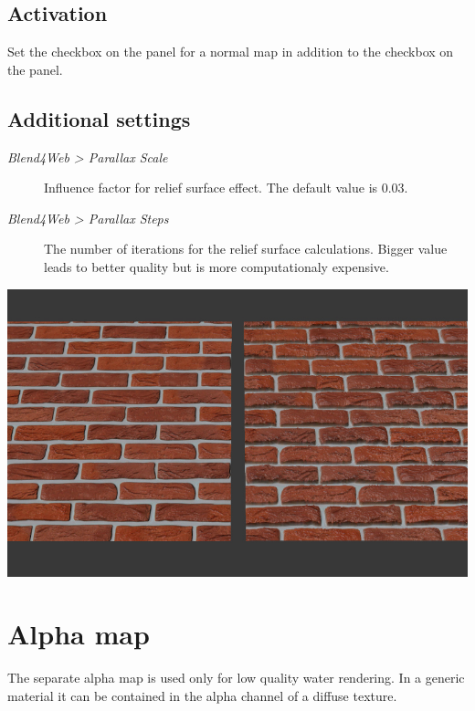 \documentclass[a4paper,12pt,oneside]{sphinxmanual}
\begin{document}
\subsection{Activation}
\label{textures:id10}
Set the  checkbox on the  panel for a normal map in addition to the  checkbox on the  panel.


\subsection{Additional settings}
\label{textures:id11}\begin{description}
\item[{\emph{Blend4Web \textgreater{} Parallax Scale}}] \leavevmode
Influence factor for relief surface effect. The default value is 0.03.

\item[{\emph{Blend4Web \textgreater{} Parallax Steps}}] \leavevmode
The number of iterations for the relief surface calculations. Bigger value leads to better quality but is more computationaly expensive.

\end{description}

{\hfill\includegraphics[width=1.000\linewidth]{parallax.jpg}\hfill}

\begin{DUlineblock}{0em}
\item[] 
\end{DUlineblock}


\section{Alpha map}
\label{textures:alpha-map}\label{textures:texture-alpha-map}\label{textures:index-8}
The separate alpha map is used only for low quality water rendering. In a generic material it can be contained in the alpha channel of a diffuse texture.
\end{document}
